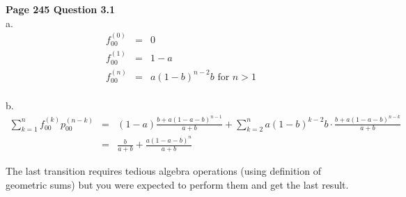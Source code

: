 \documentclass[10pt,a4paper]{article}
\begin{document}
\begin{flushleft}
\textbf{Page 245 Question 3.1}\\

a.  \begin{eqnarray*}
f_{00}^{(0)}&=&0\\
f_{00}^{(1)}&=&1-a\\
f_{00}^{(n)}&=&a(1-b)^{n-2}b \textrm{ for $n>1$}\\
\end{eqnarray*}

b. \begin{eqnarray*} \sum_{k=1}^n f_{00}^{(k)} p_{00}^{(n-k)} &=&
(1-a) \frac{b+a(1-a-b)^{n-1}}{a+b} + \sum_{k=2}^n a(1-b)^{k-2}b
\cdot \frac{b+a(1-a-b)^{n-k}}{a+b}\\
&=& \frac{b}{a+b} + \frac{a(1-a-b)^{n}}{a+b}
\end{eqnarray*}

The last transition requires tedious algebra operations (using
definition of geometric sums) but you were expected to perform
them and get the last result.


\begin{eqnarray*}
\\
\end{eqnarray*}

\end{flushleft}
\end{document}
